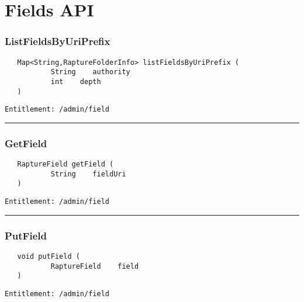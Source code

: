 \chapter{Fields API}

\subsection{ListFieldsByUriPrefix}
\label{Api:ListFieldsByUriPrefix}
\begin{Verbatim}
   Map<String,RaptureFolderInfo> listFieldsByUriPrefix (
           String    authority
           int    depth
   )
\end{Verbatim}
\begin{Verbatim}[formatcom=\color{Maroon}]
  Entitlement: /admin/field
\end{Verbatim}



\rule{12cm}{2pt}
\subsection{GetField}
\label{Api:GetField}
\begin{Verbatim}
   RaptureField getField (
           String    fieldUri
   )
\end{Verbatim}
\begin{Verbatim}[formatcom=\color{Maroon}]
  Entitlement: /admin/field
\end{Verbatim}



\rule{12cm}{2pt}
\subsection{PutField}
\label{Api:PutField}
\begin{Verbatim}
   void putField (
           RaptureField    field
   )
\end{Verbatim}
\begin{Verbatim}[formatcom=\color{Maroon}]
  Entitlement: /admin/field
\end{Verbatim}



